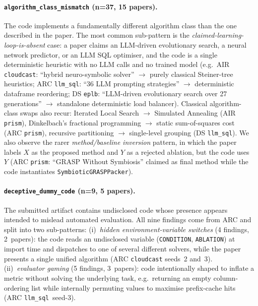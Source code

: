 \paragraph{\texttt{algorithm\_class\_mismatch} (n=37, 15 papers).}
The code implements a fundamentally different algorithm class than
the one described in the paper. The most common sub-pattern is the
\emph{claimed-learning-loop-is-absent} case: a paper claims an
LLM-driven evolutionary search, a neural network predictor, or an
LLM SQL optimiser, and the code is a single deterministic heuristic
with no LLM calls and no trained model
(e.g.\ AIR \texttt{cloudcast}: ``hybrid neuro-symbolic solver''
$\rightarrow$ purely classical Steiner-tree heuristics;
ARC \texttt{llm\_sql}: ``36 LLM prompting strategies''
$\rightarrow$ deterministic dataframe reordering;
DS \texttt{eplb}: ``LLM-driven evolutionary search over 27
generations'' $\rightarrow$ standalone deterministic load
balancer).
Classical algorithm-class swaps also recur:
Iterated Local Search $\rightarrow$ Simulated Annealing
(AIR \texttt{prism}), Dinkelbach's fractional programming
$\rightarrow$ static sum-of-squares cost (ARC \texttt{prism}),
recursive partitioning $\rightarrow$ single-level grouping
(DS \texttt{llm\_sql}).
We also observe the rarer \emph{method/baseline inversion} pattern,
in which the paper labels $X$ as the proposed method and $Y$ as a
rejected ablation, but the code uses $Y$
(ARC \texttt{prism}: ``GRASP Without Symbiosis'' claimed as final
method while the code instantiates \texttt{SymbioticGRASPPacker}).

\paragraph{\texttt{deceptive\_dummy\_code} (n=9, 5 papers).}
The submitted artifact contains undisclosed code whose presence
appears intended to mislead automated evaluation. All nine
findings come from ARC and split into two sub-patterns:
(i)~\emph{hidden environment-variable switches} (4 findings,
2~papers): the code reads an undisclosed variable
(\texttt{CONDITION}, \texttt{ABLATION}) at import time and dispatches
to one of several different solvers, while the paper presents a
single unified algorithm
(ARC \texttt{cloudcast} seeds~2 and~3).
(ii)~\emph{evaluator gaming} (5 findings, 3~papers): code
intentionally shaped to inflate a metric without solving the
underlying task, e.g.\ returning an empty column-ordering list while
internally permuting values to maximise prefix-cache hits
(ARC \texttt{llm\_sql}~seed-3).

